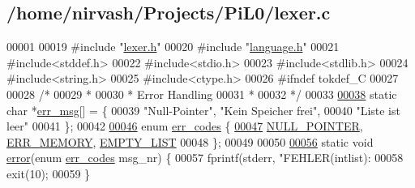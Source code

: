 \hypertarget{lexer_8c_source}{\subsection{/home/nirvash/\-Projects/\-Pi\-L0/lexer.c}
}

\begin{DoxyCode}
00001 
00019 \textcolor{preprocessor}{#include "\hyperlink{lexer_8h}{lexer.h}"}
00020 \textcolor{preprocessor}{#include "\hyperlink{language_8h}{language.h}"}
00021 \textcolor{preprocessor}{#include<stddef.h>}
00022 \textcolor{preprocessor}{#include<stdio.h>}
00023 \textcolor{preprocessor}{#include<stdlib.h>}
00024 \textcolor{preprocessor}{#include<string.h>}
00025 \textcolor{preprocessor}{#include<ctype.h>}
00026 \textcolor{preprocessor}{#ifndef tokdef\_C}
00027 \textcolor{preprocessor}{}
00028 \textcolor{comment}{/*}
00029 \textcolor{comment}{ * }
00030 \textcolor{comment}{ * Error Handling}
00031 \textcolor{comment}{ * }
00032 \textcolor{comment}{*/}
00033 
\hypertarget{lexer_8c_source_l00038}{}\hyperlink{lexer_8c_ac904322e9cd774d033d702016491a991}{00038} \textcolor{keyword}{static} \textcolor{keywordtype}{char} *\hyperlink{lexer_8c_ac904322e9cd774d033d702016491a991}{err_msg}[] = \{
00039     \textcolor{stringliteral}{"Null-Pointer"}, \textcolor{stringliteral}{"Kein Speicher frei"},
00040     \textcolor{stringliteral}{"Liste ist leer"}
00041   \}; 
00042   
\hypertarget{lexer_8c_source_l00046}{}\hyperlink{lexer_8c_ad7109e2dccd18353c3bdd5f55ad94b55}{00046} \textcolor{keyword}{enum} \hyperlink{lexer_8c_ad7109e2dccd18353c3bdd5f55ad94b55}{err_codes} \{
\hypertarget{lexer_8c_source_l00047}{}\hyperlink{lexer_8c_ad7109e2dccd18353c3bdd5f55ad94b55a4fb873dc451927ef6a70af3a1e7f08bd}{00047}     \hyperlink{lexer_8c_ad7109e2dccd18353c3bdd5f55ad94b55a4fb873dc451927ef6a70af3a1e7f08bd}{NULL_POINTER}, \hyperlink{lexer_8c_ad7109e2dccd18353c3bdd5f55ad94b55afb88c5fa6e7d51074ec36bd4578e03a0}{ERR_MEMORY}, \hyperlink{lexer_8c_ad7109e2dccd18353c3bdd5f55ad94b55a60202b752d64be3e9634f160ce5dca7d}{EMPTY_LIST}
00048   \};
00049   
00050 
\hypertarget{lexer_8c_source_l00056}{}\hyperlink{lexer_8c_a8b4b6428a8bf1450cf23b6032dec56cf}{00056} \textcolor{keyword}{static} \textcolor{keywordtype}{void} \hyperlink{lexer_8c_a8b4b6428a8bf1450cf23b6032dec56cf}{error}(\textcolor{keyword}{enum} \hyperlink{lexer_8c_ad7109e2dccd18353c3bdd5f55ad94b55}{err_codes} msg\_nr) \{
00057   fprintf(stderr, \textcolor{stringliteral}{"FEHLER(intlist): %
00058   exit(10);
00059 \}
}
\end{DoxyCode}
